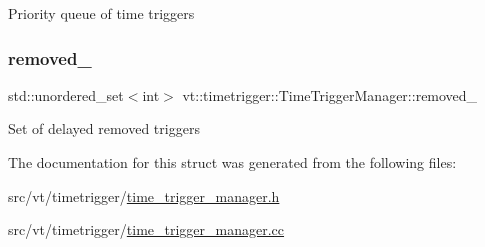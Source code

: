 Priority queue of time triggers \mbox{\label{structvt_1_1timetrigger_1_1_time_trigger_manager_aac6dda4fd78e5338f6bec56b75e038cd}} 
\subsubsection{\texorpdfstring{removed\+\_\+}{removed\_}}
{\footnotesize\ttfamily std\+::unordered\+\_\+set$<$int$>$ vt\+::timetrigger\+::\+Time\+Trigger\+Manager\+::removed\+\_\+\hspace{0.3cm}{\ttfamily [private]}}

Set of delayed removed triggers 

The documentation for this struct was generated from the following files\+:\begin{DoxyCompactItemize}
\item 
src/vt/timetrigger/\hyperlink{time__trigger__manager_8h}{time\+\_\+trigger\+\_\+manager.\+h}\item 
src/vt/timetrigger/\hyperlink{time__trigger__manager_8cc}{time\+\_\+trigger\+\_\+manager.\+cc}\end{DoxyCompactItemize}
